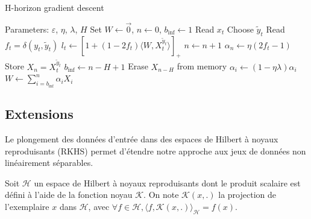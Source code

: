 \documentclass[preprint,12pt,authoryear]{elsarticle}
\begin{document}
\begin{algorithm}[t!]
	\caption{H-horizon gradient descent}
	\begin{algorithmic}
		
		\STATE Parameters:  $\varepsilon$, $\eta$, $\lambda$, $H$
		\STATE Set $W \leftarrow \vec{0}$, $n \leftarrow 0$, $b_\text{inf}\leftarrow 1$
		\STATE Read $x_t$
		\STATE Choose $\tilde{y}_t$		\STATE Read $f_t = \delta(y_t,\tilde{y}_t)$
		\STATE $l_t \leftarrow \left[ 1+(1-2f_t)\langle W,X_t^{\tilde{y}_t}\rangle\right]_{+}$ 
		\STATE $n \leftarrow n + 1$
		\STATE $\alpha_{n} \leftarrow \eta (2 f_t-1)$
		\STATE Store $X_{n} = X_t^{\tilde{y}_t}$
		\STATE $b_\text{inf} \leftarrow n - H + 1$
		\STATE Erase $X_{n - H }$ from memory
		\ENDIF 
		\STATE $\alpha_i \leftarrow (1 - \eta\lambda) \alpha_i$
		\ENDFOR			
		\STATE $W \leftarrow \sum_{i=b_\text{inf}}^n \alpha_i X_{i}$
		\ENDIF
		\ENDFOR
	\end{algorithmic}
\end{algorithm}


\subsection{Extensions}
Le plongement des données d'entrée dans des espaces de Hilbert à noyaux reproduisants (RKHS) permet d'étendre notre approche aux jeux de données non linéairement séparables. 

Soit $\mathcal{H}$ un espace de Hilbert à noyaux reproduisants dont le produit scalaire est défini à l'aide de la fonction noyau $\mathcal{K}$. On note $\mathcal{K}(x,.)$ la projection de l'exemplaire $x$ dans $\mathcal{H}$, avec $\forall f \in \mathcal{H}, \langle f,\mathcal{K}(x,.)\rangle_\mathcal{H} = f(x) $.
\end{document}
